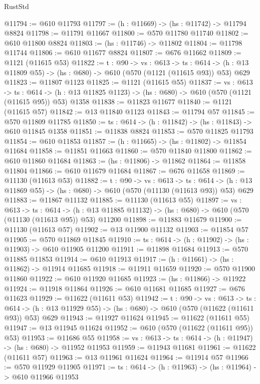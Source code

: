 \begin{lexlean}{RustStd}
\begin{coremodule}
@11794 := @610 @11793
@11797 := (h : @11669) -> (hs : @11742) -> @11794 @8824
@11798 := @11791 @11667
@11800 := @570 @11780 @11740
@11802 := @610 @11800 @8824
@11803 := (hs : @11746) -> @11802
@11804 := @11798 @11744
@11806 := @610 @11677 @8824
@11807 := @676 @11662
@11809 := @1121 (@11615 @53)
@11822 := {t : @90} ->
  {vs : @613} ->
  {ts : @614} -> (h : @13 @11809 @55) -> (hs : @680) -> @610 (@570 (@1121 (@11615 @93)) @53) @629
@11823 := @11807 @1123
@11825 := @1121 (@11615 @55)
@11837 := {vs : @613} ->
  {ts : @614} -> (h : @13 @11825 @1123) -> (hs : @680) -> @610 (@570 (@1121 (@11615 @95)) @53) @1358
@11838 := @11823 @11677
@11840 := @1121 (@11615 @57)
@11842 := @13 @11840 @1123
@11843 := @11794 @57
@11845 := @570 @11809 @11785
@11850 := {ts : @614} -> (h : @11842) -> (hs : @11843) -> @610 @11845 @1358
@11851 := @11838 @8824
@11853 := @570 @11825 @11793
@11854 := @610 @11853
@11857 := (h : @11665) -> (hs : @11802) -> @11854 @11684
@11858 := @11851 @11663
@11860 := @570 @11840 @11800
@11862 := @610 @11860 @11684
@11863 := (hs : @11806) -> @11862
@11864 := @11858 @11804
@11866 := @610 @11679 @11684
@11867 := @676 @11658
@11869 := @11130 (@11613 @53)
@11882 := {t : @90} ->
  {vs : @613} ->
  {ts : @614} -> (h : @13 @11869 @55) -> (hs : @680) -> @610 (@570 (@11130 (@11613 @93)) @53) @629
@11883 := @11867 @11132
@11885 := @11130 (@11613 @55)
@11897 := {vs : @613} ->
  {ts : @614} ->
  (h : @13 @11885 @11132) -> (hs : @680) -> @610 (@570 (@11130 (@11613 @95)) @53) @11200
@11898 := @11883 @11679
@11900 := @11130 (@11613 @57)
@11902 := @13 @11900 @11132
@11903 := @11854 @57
@11905 := @570 @11869 @11845
@11910 := {ts : @614} -> (h : @11902) -> (hs : @11903) -> @610 @11905 @11200
@11911 := @11898 @11684
@11913 := @570 @11885 @11853
@11914 := @610 @11913
@11917 := (h : @11661) -> (hs : @11862) -> @11914 @11685
@11918 := @11911 @11659
@11920 := @570 @11900 @11860
@11922 := @610 @11920 @11685
@11923 := (hs : @11866) -> @11922
@11924 := @11918 @11864
@11926 := @610 @11681 @11685
@11927 := @676 @11623
@11929 := @11622 (@11611 @53)
@11942 := {t : @90} ->
  {vs : @613} ->
  {ts : @614} -> (h : @13 @11929 @55) -> (hs : @680) -> @610 (@570 (@11622 (@11611 @93)) @53) @629
@11943 := @11927 @11624
@11945 := @11622 (@11611 @55)
@11947 := @13 @11945 @11624
@11952 := @610 (@570 (@11622 (@11611 @95)) @53)
@11953 := @11686 @55
@11958 := {vs : @613} -> {ts : @614} -> (h : @11947) -> (hs : @680) -> @11952 @11953
@11959 := @11943 @11681
@11961 := @11622 (@11611 @57)
@11963 := @13 @11961 @11624
@11964 := @11914 @57
@11966 := @570 @11929 @11905
@11971 := {ts : @614} -> (h : @11963) -> (hs : @11964) -> @610 @11966 @11953

\end{coremodule}
\end{lexlean}
